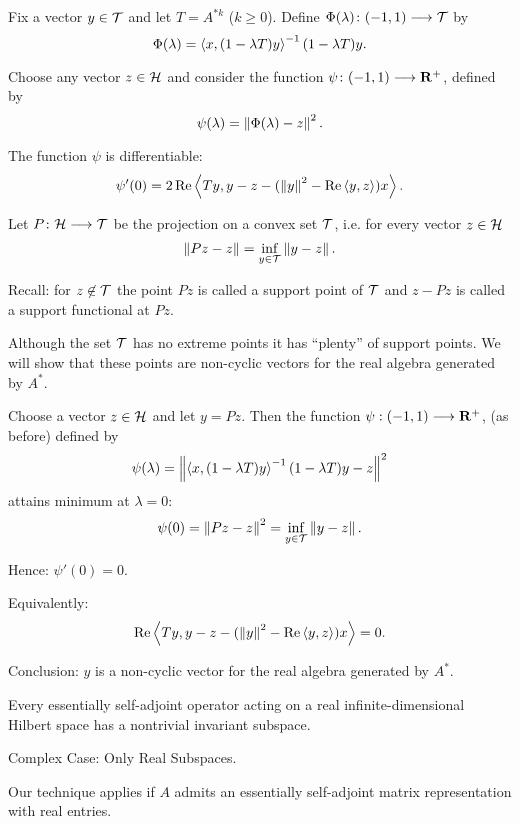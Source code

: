 \begin{slide}{}
Fix a vector $y\in\mathcal{T}$ and let $T=A^{*k}$ ($k\geq0$).
Define $\Phi(\lambda)\colon(-1,1)\longrightarrow\mathcal{T}$ by
\[ \Phi(\lambda)=\left<x,(1-\lambda T)y\right>^{-1}(1-\lambda T)y. \]

Choose any vector $z\in\mathcal{H}$ and consider the function
$\psi\colon(-1,1)\longrightarrow\mathbf{R}^{+}$, defined by
\[ \psi(\lambda) = \left\Vert\Phi(\lambda)-z\right\Vert^2. \]

The function $\psi$ is differentiable:
\[ \psi'(0) =
   2\operatorname{Re}\left<T y, y - z - (\left\Vert y\right\Vert^2-\operatorname{Re}\left<y,z\right>)x\right>. \]
\end{slide}


\begin{slide}{}
Let $P\colon\mathcal{H}\longrightarrow\mathcal{T}$ be the projection on a convex set
$\mathcal{T}$, i.e. for every vector $z\in\mathcal{H}$
\[ \left\Vert P z - z\right\Vert = \inf_{y\in\mathcal{T}}\left\Vert y-z\right\Vert. \]

Recall: for $z\not\in\mathcal{T}$ the point $P{}z$ is called a
support point of $\mathcal{T}$ and $z-P{}z$ is called a support
functional at $P{}z$.

Although the set $\mathcal{T}$ has no extreme points it has
``plenty'' of support points. We will show that these points
are non-cyclic vectors for the real algebra generated by $A^*$.
\end{slide}


\begin{slide}{}
Choose a vector $z\in\mathcal{H}$ and let $y=P{z}$. Then the function
$\psi:(-1,1)\longrightarrow\mathbf{R}^{+}$, (as before) defined by
\[ \psi(\lambda)=
   \left\Vert\left<x,(1-\lambda T)y\right>^{-1}(1-\lambda T)y-z\right\Vert^2 \]
attains minimum at $\lambda=0$:
\[ \psi(0) = \left\Vert P z - z \right\Vert^2 = \inf_{y\in\mathcal{T}}\left\Vert y-z\right\Vert. \]

Hence: $\psi'(0)=0$.

Equivalently:
\[ \operatorname{Re}\left<T y, y - z - (\left\Vert y\right\Vert^2-\operatorname{Re}\left<y,z\right>)x\right> = 0. \]

Conclusion: $y$ is a non-cyclic vector for the real algebra
generated by $A^*$.
\end{slide}


\begin{slide}{}
\begin{thm}
Every essentially self-adjoint operator acting on a real
infinite-dimensional Hil\-bert space has a nontrivial invariant
subspace.
\end{thm}

\medskip

Complex Case: Only Real Subspaces.

Our technique applies if $A$ admits an essentially self-adjoint
matrix representation with real entries.
\end{slide}



